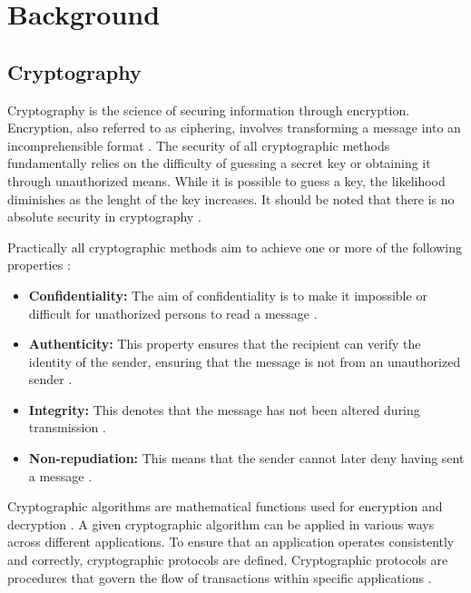 \chapter{Background}
\section{Cryptography}

Cryptography is the science of securing information through encryption. Encryption, also referred to as ciphering, involves transforming a message into an incomprehensible format \cite[18]{crypto}. The security of all cryptographic methods fundamentally relies on the difficulty of guessing a secret key or obtaining it through unauthorized means. While it is possible to guess a key, the likelihood diminishes as the lenght of the key increases. It should be noted that there is no absolute security in cryptography \cite[25]{crypto}.

Practically all cryptographic methods aim to achieve one or more of the following properties \cite[18]{crypto}:
\begin{itemize}
    \item \textbf{Confidentiality:} The aim of confidentiality is to make it impossible or difficult for unathorized persons to read a message \cite[18]{crypto}.
    \item \textbf{Authenticity:} This property ensures that the recipient can verify the identity of the sender, ensuring that the message is not from an unauthorized sender \cite[18]{crypto}.
    \item \textbf{Integrity:} This denotes that the message has not been altered during transmission \cite[18]{crypto}.
    \item \textbf{Non-repudiation:} This means that the sender cannot later deny having sent a message \cite[18]{crypto}.
\end{itemize}

Cryptographic algorithms are mathematical functions used for encryption and decryption \cite[19]{crypto}. A given cryptographic algorithm can be applied in various ways across different applications. To ensure that an application operates consistently and correctly, cryptographic protocols are defined. Cryptographic protocols are procedures that govern the flow of transactions within specific applications \cite[22]{crypto}.

